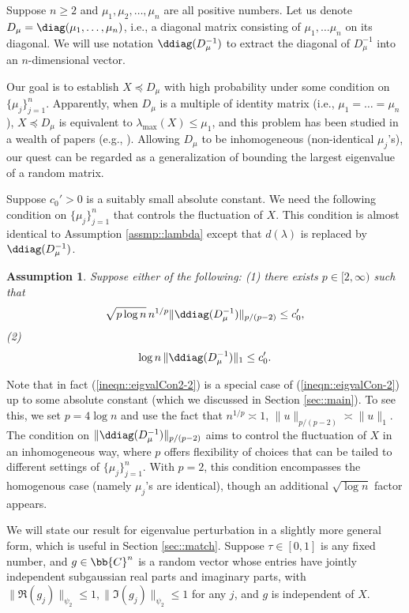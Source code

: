 \documentclass[12pt]{article}%
\theoremstyle{plain}%
\newtheorem{assmp}{Assumption}[section]
\theoremstyle{remark}
\begin{document}
Suppose $n \ge 2$ and $\mu_1, \mu_2 , \ldots , \mu_n$ are all positive numbers.  Let us denote $D_\mu = \diag( \mu_1,\ldots, \mu_n )$, i.e., a diagonal matrix consisting of $\mu_1,\ldots \mu_n$ on its diagonal. We will use notation $\ddiag(D_\mu^{-1})$ to extract the diagonal of $D_\mu^{-1}$ into an $n$-dimensional vector. 

Our goal is to establish $X \preceq D_\mu$ with high probability under some condition on $\{ \mu_j\}_{j=1}^n$. Apparently, when $D_\mu$ is a multiple of identity matrix (i.e., $\mu_1 = \ldots = \mu_n$), $X \preceq D_\mu$ is equivalent to $\lambda_{\max}(X) \le \mu_1$, and this problem has been studied in a wealth of papers (e.g., \citep{RudVer10,Ver10}). Allowing $D_{\mu}$ to be inhomogeneous (non-identical $\mu_j$'s), our quest can be regarded as a generalization of bounding the largest eigenvalue of a random matrix. 

Suppose $c_0' > 0$ is a suitably small absolute constant. We need the following condition on $\{ \mu_j\}_{j=1}^n$ that controls the fluctuation of $X$. This condition is almost identical to Assumption \ref{assmp::lambda} except that $d(\lambda)$ is replaced by $\ddiag(D_{\mu}^{-1})$. 
\begin{assmp}\label{assmp::mu}
Suppose either of the following: (1) there exists $p \in [2, \infty)$ such that  
\begin{equation}\label{ineqn::eigvalCon-2}
\sqrt{p\log n}\, n^{1/p}\| \ddiag(D_{\mu}^{-1}) \|_{p/(p-2)} \le c_0', 
\end{equation}
(2)
\begin{equation}\label{ineqn::eigvalCon2-2}
\log n \,\| \ddiag(D_{\mu}^{-1}) \|_{1} \le c_0'.
\end{equation}
\end{assmp}
Note that in fact (\ref{ineqn::eigvalCon2-2}) is a special case of (\ref{ineqn::eigvalCon-2}) up to some absolute constant (which we discussed in Section \ref{sec::main}). To see this, we set $p = 4\log n$ and use the fact that $n^{1/p} \asymp 1$, $\| u \|_{p/(p-2)} \asymp \| u \|_1$. The condition on $\| \ddiag(D_{\mu}^{-1}) \|_{p/(p-2)}$ aims to control the fluctuation of $X$ in an inhomogeneous way, where $p$ offers flexibility of choices that can be tailed to different settings of $\{ \mu_j \}_{j=1}^n$. With $p=2$, this condition encompasses the homogenous case (namely $\mu_j$'s are identical), though an additional $\sqrt{\log n}$ factor appears.

We will state our result for eigenvalue perturbation in a slightly more general form, which is useful in Section \ref{sec::match}. Suppose $\tau \in [0, 1]$ is any fixed number, and $g \in \bb{C}^n$ is a random vector whose entries have jointly independent subgaussian real parts and imaginary parts, with $\| \Re(g_j) \|_{\psi_2} \le 1, \| \Im(g_j) \|_{\psi_2} \le 1$ for any $j$, and $g$ is independent of $X$. 
\end{document}
